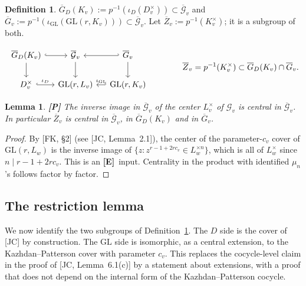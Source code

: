 \documentclass[12pt]{article}
\newcommand{\ov}[1]{\overline{#1}}
\newcommand{\GL}{\mathrm{GL}}
\newcommand{\Gb}{\ov{G}}
\newcommand{\Zb}{\ov{Z}}
\newcommand{\GDb}{\ov{G}_D}
\newcommand{\cG}{\mathcal{G}}
\newcommand{\cGb}{\ov{\mathcal{G}}}
\newcommand{\iD}{\iota_D}
\newcommand{\iG}{\iota_{\GL}}
\newcommand{\Pv}{\textbf{[P]}}
\newcommand{\Ev}{\textbf{[E]}}
\theoremstyle{plain}
\newtheorem{lemma}[theorem]{Lemma}
\theoremstyle{definition}
\newtheorem{definition}[theorem]{Definition}
\begin{document}
\begin{definition}\label{def:localcovers}
$\GDb(K_v):=p^{-1}(\iD(D_v^\times))\subset\cGb_v$ and $\Gb_v:=p^{-1}(\iG(\GL(r,K_v)))\subset\cGb_v$. Let $\Zb_v:=p^{-1}(K_v^\times)$; it is a subgroup of both.
\end{definition}

\begin{equation}\label{eq:diagram}
\begin{tikzcd}[column sep=small]
\GDb(K_v)\arrow[r,hook]\arrow[d] & \cGb_v\arrow[d] & \Gb_v\arrow[l,hook']\arrow[d]\\
D_v^\times\arrow[r,hook,"\iD"] & \GL(r,L_v) & \GL(r,K_v)\arrow[l,hook',"\iG"']
\end{tikzcd}
\qquad\qquad \Zb_v=p^{-1}(K_v^\times)\subset\GDb(K_v)\cap\Gb_v.
\end{equation}

\begin{lemma}\label{lem:center}\Pv
The inverse image in $\cGb_v$ of the center $L_v^\times$ of $\cG_v$ is central in $\cGb_v$. In particular $\Zb_v$ is central in $\cGb_v$, in $\GDb(K_v)$ and in $\Gb_v$.
\end{lemma}
\begin{proof}
By [FK, \S2] (see [JC, Lemma~2.1]), the center of the parameter-$c_v$ cover of $\GL(r,L_w)$ is the inverse image of $\{z:z^{r-1+2rc_v}\in L_w^{\times n}\}$, which is all of $L_w^\times$ since $n\mid r-1+2rc_v$. This is an \Ev\ input. Centrality in the product with identified $\mu_n$'s follows factor by factor.
\end{proof}

\subsection{The restriction lemma}\label{subsec:restriction}
We now identify the two subgroups of Definition~\ref{def:localcovers}. The $D$ side is the cover of [JC] by construction. The $\GL$ side is isomorphic, as a central extension, to the Kazhdan--Patterson cover with parameter $c_v$. This replaces the cocycle-level claim in the proof of [JC, Lemma~6.1(c)] by a statement about extensions, with a proof that does not depend on the internal form of the Kazhdan--Patterson cocycle.
\end{document}
